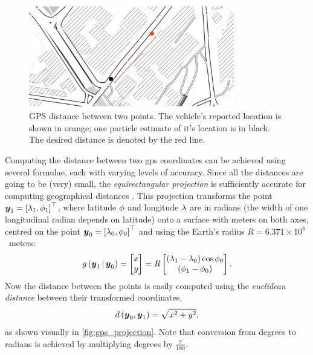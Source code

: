 \begin{knitrout}\small
{}\color{fgcolor}\begin{figure}

{\centering \includegraphics[width=0.8\textwidth]{figure/gps_dist-1} 

}

\caption[GPS distance between two points]{GPS distance between two points. The vehicle's reported location is shown in orange; one particle estimate of it's location is in black. The desired distance is denoted by the red line.}\label{fig:gps_dist}
\end{figure}


\end{knitrout}

Computing the distance between two \gls{gps} coordinates can be achieved using several formulae, each with varying levels of accuracy. Since all the distances are going to be (very) small, the \emph{equirectangular projection} is sufficiently accurate for computing geographical distances \citep{Snyder_1998}. This projection transforms the point $\boldsymbol{y}_1 = \left[\lambda_1, \phi_1\right]^\top$, where latitude $\phi$ and longitude $\lambda$ are in radians (the width of one longitudinal radian depends on latitude) onto a surface with meters on both axes, centred on the point $\boldsymbol{y}_0 = \left[\lambda_0, \phi_0\right]^\top$ and using the Earth's radius $R = 6.371 \times 10^6$~meters:
\begin{equation}
\label{eq:equirectangular_projection}
g\left(\boldsymbol{y}_1\,|\,\boldsymbol{y}_0\right) =
\begin{bmatrix} x \\ y \end{bmatrix} =
R \begin{bmatrix}
(\lambda_1 - \lambda_0) \cos \phi_0 \\
(\phi_1 - \phi_0)
\end{bmatrix}.
\end{equation}
Now the distance between the points is easily computed using the \emph{euclidean distance} between their transformed coordinates,
\begin{equation}
\label{eq:obs_dist}
d\left(\boldsymbol{y}_0, \boldsymbol{y}_1\right) = \sqrt{x^2 + y^2},
\end{equation}
as shown visually in \cref{fig:gps_projection}. Note that conversion from degrees to radians is achieved by multiplying degrees by $\frac{\pi}{180}$.

